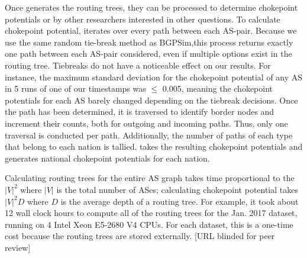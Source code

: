 \par Once \toolname{} generates the routing trees, they can be processed to
determine chokepoint potentials or by other researchers interested in other questions. To calculate chokepoint potential, \toolname{} iterates over every path
between each AS-pair. Because we use the same random tie-break method as BGPSim,this process returns 
exactly one path between each AS-pair considered, even if multiple options exist in the
routing tree. Tiebreaks do not have a noticeable effect on our results. For instance, the maximum
standard deviation for the chokepoint potential of any AS in 5 runs of one of our timestamps was 
$\leq$ 0.005, meaning the chokepoint potentials for each AS barely changed depending on the tiebreak
decisions.
Once the path has been determined, it is traversed to identify border nodes and increment their counts, both
for outgoing and incoming paths.  Thus, only one traversal is conducted
per path. Additionally, the number of paths of each type that belong to each
nation is tallied. \toolname{} takes the resulting chokepoint
potentials and generates national chokepoint potentials for each nation.

Calculating routing trees for the entire AS graph takes time proportional to the $|V|^2$ where $|V|$ is the total number of ASes; calculating chokepoint potential takes $|V|^2D$ where $D$ is the average depth of a routing tree. For example,
it took about 12 wall clock hours to compute all of the routing trees for the Jan. 2017 dataset, running on 4 Intel Xeon E5-2680 V4 CPUs.  For each dataset, this is a one-time cost because the routing trees are stored externally.  [URL blinded for peer review] 
